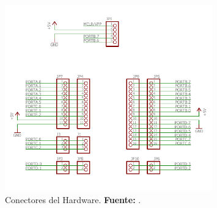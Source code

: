 


\begin{figure}[H]
	\centering
		\includegraphics[width=0.8\textwidth]{./Cap4imagen/Conectores.pdf}
	\caption[Conectores del Hardware.]{Conectores del Hardware.\textbf{ Fuente:} \cite{Tu}.}
	\label{Esch3} %
\end{figure}




